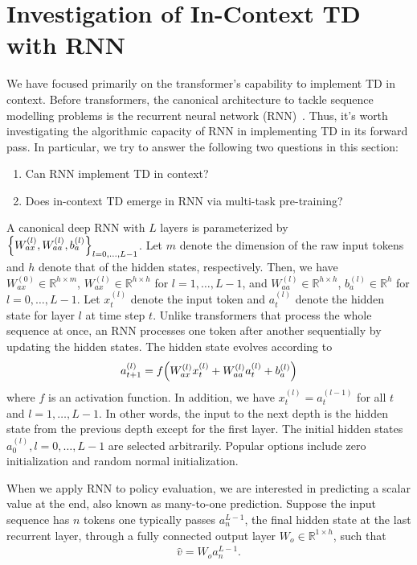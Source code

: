 \documentclass{article}
\newcommand{\R}{\mathbb{R}}
\begin{document}
\section{Investigation of In-Context TD with RNN}
We have focused primarily on the transformer's capability to implement TD in context.
Before transformers, the canonical architecture to tackle sequence modelling problems is the recurrent neural network (RNN)~\citep{ elman1990finding, bengio2017deep}.
Thus, it's worth investigating the algorithmic capacity of RNN in implementing TD in its forward pass.
In particular, we try to answer the following two questions in this section:
\begin{enumerate}
    \item Can RNN implement TD in context? \label{question: rnn can}
    \item Does in-context TD emerge in RNN via multi-task pre-training? \label{question: rnn do}
\end{enumerate}

A canonical deep RNN with $L$ layers is parameterized by $\qty{W_{ax}^{(l)}, W_{aa}^{(l)}, b^{(l)}_{a}}_{l=0,\dots,L-1}$.
Let $m$ denote the dimension of the raw input tokens and $h$ denote that of the hidden states, respectively.
Then, we have $W_{ax}^{(0)} \in \R^{h\times m}$, $W_{ax}^{(l)} \in \R^{h\times h}$ for $l= 1, \dots, L-1$, and $ W_{aa}^{(l)} \in \R^{h\times h}$, $ b^{(l)}_a \in \R^h$ for $l=0,\dots,L-1$.
Let $x_t^{(l)}$ denote the input token and $a_t^{(l)}$ denote the hidden state for layer $l$ at time step $t$.
Unlike transformers that process the whole sequence at once, an RNN processes one token after another sequentially by updating the hidden states.
The hidden state evolves according to
\begin{align}
    a_{t+1}^{(l)} = f\qty(W_{ax}^{(l)}x_t^{(l)} + W_{aa}^{(l)}a_t^{(l)} + b_a^{(l)})
\end{align}
where $f$ is an activation function.
In addition, we have $x_t^{(l)} = a_t^{(l-1)}$ for all $t$ and $l = 1,\dots, L-1$.
In other words, the input to the next depth is the hidden state from the previous depth except for the first layer.
The initial hidden states $a_0^{(l)}, l = 0, \dots, L-1$ are selected arbitrarily.
Popular options include zero initialization and random normal initialization.

When we apply RNN to policy evaluation, we are interested in predicting a scalar value at the end, also known as many-to-one prediction.
Suppose the input sequence has $n$ tokens one typically passes $a_n^{L-1}$, the final hidden state at the last recurrent layer, through a fully connected output layer $W_o \in \R^{1 \times h}$, such that
\begin{align}
    \hat{v} = W_o a_n^{L-1}.
\end{align}
\end{document}
